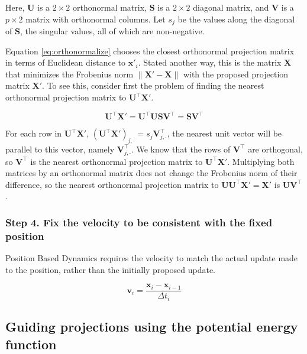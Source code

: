 Here, \(\mathbf U\) is a \(2\times 2\) orthonormal matrix, \(\mathbf S\) is a \(2\times 2\) diagonal matrix, and \(\mathbf V\) is a \(p\times 2\) matrix with orthonormal columns. Let \(s_j\) be the values along the diagonal of \(\mathbf S\), the singular values, all of which are non-negative.

Equation \eqref{eq:orthonormalize} chooses the closest orthonormal projection matrix in terms of Euclidean distance to \(\mathbf{x'}_i\).
Stated another way, this is the matrix \(\mathbf X\) that minimizes the Frobenius norm \(\|\mathbf X' - \mathbf X\|\) with the proposed projection matrix \(\mathbf X'\).
To see this, consider first the problem of finding the nearest orthonormal projection matrix to
\(\mathbf{ U^\top X' }\).

\[
\mathbf{ U^\top X' = U^\top USV^\top =SV^\top }
\]

For each row in
\(\mathbf{ U^\top X' }\),
\(\mathbf{\left(U^\top X' \right)}_{j,\cdot} = s_j \mathbf V^\top_{j,\cdot}\),
the nearest unit vector will be parallel to this vector, namely
\(\mathbf V^\top_{j,\cdot}\).
We know that the rows of
\(\mathbf V^\top\) are orthogonal, so
\(\mathbf V^\top\) is the nearest orthonormal projection matrix to
\(\mathbf{U^\top X' }\).
Multiplying both matrices by an orthonormal matrix does not change the Frobenius norm of their difference, so the nearest orthonormal projection matrix to
\(\mathbf{UU^\top X' = X'}\) is
\(\mathbf{UV^\top}\).

\hypertarget{step-4.-fix-the-velocity-to-be-consistent-with-the-fixed-position}{%
\subsubsection{Step 4. Fix the velocity to be consistent with the fixed position}\label{step-4.-fix-the-velocity-to-be-consistent-with-the-fixed-position}}

Position Based Dynamics requires the velocity to match the actual update made to the position, rather than the initially proposed update.

\begin{equation*}
\mathbf v_i = \frac{\mathbf x_i - \mathbf x_{i-1}}{\Delta t_i}
\end{equation*}

\hypertarget{guiding-projections-using-the-potential-energy-function}{%
\subsection{Guiding projections using the potential energy function}\label{guiding-projections-using-the-potential-energy-function}}

